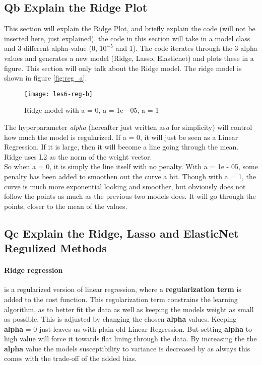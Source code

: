 \documentclass{article}
\begin{document}
\subsection{Qb Explain the Ridge Plot}
This section will explain the Ridge Plot, and briefly explain the code (will not be inserted here, just explained). the code in this section will take in a model class and 3 different alpha-value (0, $10^{-5}$ and 1). The code iterates through the 3 alpha values and generates a new model (Ridge, Lasso, Elasticnet) and plots these in a figure. This section will only talk about the Ridge model. The ridge model is shown in figure \ref{fig:reg_a}.

\begin{figure}[H]
  \centering
    \texttt{[image: les6-reg-b]}
    \caption{Ridge model with a = 0, a = 1e - 05, a = 1}
    \label{fig:les6-reg-b}
\end{figure}

The hyperparameter \textit{alpha} (hereafter just written as\textit{a} for simplicity) will control how much the model is regularized. If a = 0, it will just be seen as a Linear Regression. If it is large, then it will  become a line going through the mean. Ridge uses L2 as the norm of the weight vector. 
\\
So when a = 0, it is simply the line itself with no penalty. With a = 1e - 05, some penalty has been added to smoothen out the  curve a bit. Though with a = 1, the curve is much more exponential looking and smoother, but obviously does not follow the points as much as the previous two models does. It will go through the points, closer to the mean of the values.

\subsection{Qc Explain the Ridge, Lasso and ElasticNet Regulized Methods}

\paragraph{Ridge regression} is a regularized version of linear regression, where a \textbf{regularization term} is added to the cost function. This regularization term constrains the learning algorithm, as to better fit the data as well as keeping the models weight as small as possible. This is adjusted by changing the chosen \textbf{alpha} values. Keeping \textbf{alpha} = 0 just leaves us with plain old Linear Regression.
But setting \textbf{alpha} to high value will force it towards flat lining through the data. By increasing the the \textbf{alpha} value the models susceptibility to variance is decreased by as always this comes with the trade-off of the added bias.
\end{document}
